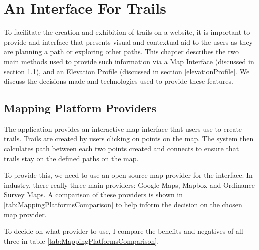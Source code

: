 \chapter{An Interface For Trails} \label{chap:TrailInterface}
To facilitate the creation and exhibition of trails on a website, it is important to provide and interface that presents visual and contextual aid to the users as they are planning a path or exploring other paths. This chapter describes the two main methods used to provide such information via a Map Interface (discussed in section \ref{mappingPlatform}), and an Elevation Profile (discussed in section \ref{elevationProfile}. We discuss the decisions made and technologies used to provide these features.

\section{Mapping Platform Providers} \label{mappingPlatform}
The application provides an interactive map interface that users use to create trails. Trails are created by users clicking on points on the map. The system then calculates path between each two points created and connects to ensure that trails stay on the defined paths on the map.

To provide this, we need to use an open source map provider for the interface. In industry, there really three main providers: Google Maps, Mapbox and Ordinance Survey Maps. A comparison of these providers is shown in \autoref{tab:MappingPlatformsComparison} to help inform the decision on the chosen map provider.

To decide on what provider to use, I compare the benefits and negatives of all three in table \ref{tab:MappingPlatformsComparison}.

